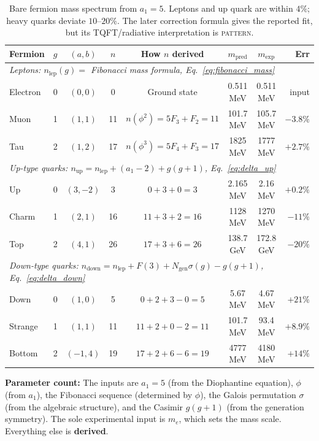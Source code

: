 \documentclass[12pt,a4paper]{article}
\theoremstyle{definition}
\begin{document}
\begin{table}[H]
\centering
\begin{tabular}{lccccccr}
\toprule
\textbf{Fermion} & $g$ & $(a,b)$ & $n$ & \textbf{How $n$ derived} & $m_{\text{pred}}$ & $m_{\text{exp}}$ & \textbf{Err} \\
\midrule
\multicolumn{8}{l}{\textit{Leptons: $n_{\text{lep}}(g) = $ Fibonacci mass formula, Eq.~\eqref{eq:fibonacci_mass}}} \\
Electron & 0 & $(0,0)$ & 0 & Ground state & 0.511 MeV & 0.511 MeV & input \\
Muon & 1 & $(1,1)$ & 11 & $n(\phi^2) = 5F_3 + F_2 = 11$ & 101.7 MeV & 105.7 MeV & $-3.8\%$ \\
Tau & 2 & $(1,2)$ & 17 & $n(\phi^3) = 5F_4 + F_3 = 17$ & 1825 MeV & 1777 MeV & $+2.7\%$ \\
\midrule
\multicolumn{8}{l}{\textit{Up-type quarks: $n_{\text{up}} = n_{\text{lep}} + (a_1-2) + g(g+1)$, Eq.~\eqref{eq:delta_up}}} \\
Up & 0 & $(3,-2)$ & 3 & $0 + 3 + 0 = 3$ & 2.165 MeV & 2.16 MeV & $+0.2\%$ \\
Charm & 1 & $(2,1)$ & 16 & $11 + 3 + 2 = 16$ & 1128 MeV & 1270 MeV & $-11\%$ \\
Top & 2 & $(4,1)$ & 26 & $17 + 3 + 6 = 26$ & 138.7 GeV & 172.8 GeV & $-20\%$ \\
\midrule
\multicolumn{8}{l}{\textit{Down-type quarks: $n_{\text{down}} = n_{\text{lep}} + F(3) + N_{\text{gen}}\sigma(g) - g(g+1)$, Eq.~\eqref{eq:delta_down}}} \\
Down & 0 & $(1,0)$ & 5 & $0 + 2 + 3 - 0 = 5$ & 5.67 MeV & 4.67 MeV & $+21\%$ \\
Strange & 1 & $(1,1)$ & 11 & $11 + 2 + 0 - 2 = 11$ & 101.7 MeV & 93.4 MeV & $+8.9\%$ \\
Bottom & 2 & $(-1,4)$ & 19 & $17 + 2 + 6 - 6 = 19$ & 4777 MeV & 4180 MeV & $+14\%$ \\
\bottomrule
\end{tabular}
\caption{Bare fermion mass spectrum from $a_1 = 5$. Leptons and up quark are within $4\%$; heavy quarks deviate $10$--$20\%$. The later correction formula gives the reported fit, but its TQFT/radiative interpretation is \textsc{pattern}.}
\label{tab:masses}
\end{table}

\textbf{Parameter count:} The inputs are $a_1 = 5$ (from the Diophantine equation), $\phi$ (from $a_1$), the Fibonacci sequence (determined by $\phi$), the Galois permutation $\sigma$ (from the algebraic structure), and the Casimir $g(g+1)$ (from the generation symmetry). The sole experimental input is $m_e$, which sets the mass scale. Everything else is \textbf{derived}.
\end{document}
